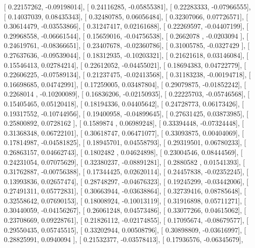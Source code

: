 \documentclass{article}
\begin{document}
       [ 0.22157262, -0.09198014],
       [ 0.24116285, -0.05855381],
       [ 0.22283333, -0.07966555],
       [ 0.14037039,  0.08435343],
       [ 0.32480785,  0.06056484],
       [ 0.32307066,  0.07726571],
       [ 0.30614479, -0.03553866],
       [ 0.31247417,  0.02161688],
       [ 0.22269597, -0.04407199],
       [ 0.29968558, -0.06661544],
       [ 0.15659016, -0.04756538],
       [ 0.2662078 , -0.0203094 ],
       [ 0.24619761, -0.08366651],
       [ 0.23407678, -0.02360786],
       [ 0.31005785, -0.0327429 ],
       [ 0.27637636, -0.09539044],
       [ 0.18312935, -0.10203321],
       [ 0.21621618,  0.03146084],
       [ 0.15546413,  0.02784214],
       [ 0.22612052, -0.04455021],
       [ 0.18694383,  0.04722779],
       [ 0.22606225, -0.07589134],
       [ 0.21237475, -0.02413568],
       [ 0.31183238, -0.00194718],
       [ 0.16698685,  0.04742991],
       [ 0.17259005,  0.03487804],
       [ 0.29079875, -0.01852242],
       [ 0.2268014 , -0.10200089],
       [ 0.16836206, -0.02150935],
       [ 0.22225703, -0.05746568],
       [ 0.15405465,  0.05120418],
       [ 0.18194336,  0.04405642],
       [ 0.24728773,  0.06173426],
       [ 0.19317552, -0.10744956],
       [ 0.19400958, -0.04899645],
       [ 0.27631425,  0.03873985],
       [ 0.25800892,  0.0728162 ],
       [ 0.1589874 ,  0.06989248],
       [ 0.33394448, -0.07324448],
       [ 0.31368348,  0.06722101],
       [ 0.30618747,  0.06471077],
       [ 0.33093875,  0.00404069],
       [ 0.17814987, -0.04581825],
       [ 0.18945701,  0.04558793],
       [ 0.29319501,  0.06780233],
       [ 0.26863157,  0.04662743],
       [ 0.1802482 ,  0.04624898],
       [ 0.23004546,  0.08444569],
       [ 0.24231054,  0.07075629],
       [ 0.32380237, -0.08891281],
       [ 0.2880582 ,  0.01541393],
       [ 0.31762887, -0.00756388],
       [ 0.17344425,  0.02620114],
       [ 0.24457838, -0.02352245],
       [ 0.13993836,  0.02657474],
       [ 0.28748297, -0.04676323],
       [ 0.19245299, -0.03442006],
       [ 0.27491311,  0.05772831],
       [ 0.30663944, -0.03638864],
       [ 0.32739416,  0.08785648],
       [ 0.32558642,  0.07690153],
       [ 0.18008924, -0.10013119],
       [ 0.31916898,  0.05711271],
       [ 0.30440059, -0.04156267],
       [ 0.26061248,  0.04573486],
       [ 0.33077266,  0.04615062],
       [ 0.23708669,  0.09228761],
       [ 0.21826112, -0.02174855],
       [ 0.17095674, -0.08679577],
       [ 0.29550435,  0.05745515],
       [ 0.33202944,  0.00508796],
       [ 0.30898809, -0.03616997],
       [ 0.28825991,  0.0940094 ],
       [ 0.21532377, -0.03578413],
       [ 0.17936576, -0.06345679],
\end{document}

